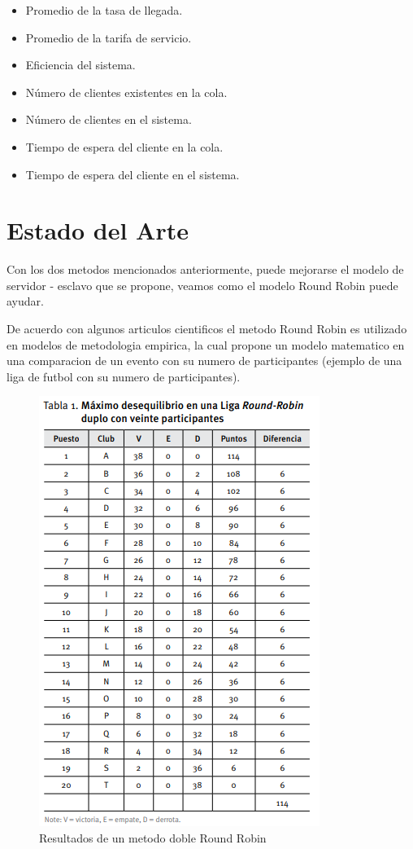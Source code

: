 \documentclass[conference,letterpaper]{IEEEtran}
\begin{document}
\begin{itemize}
    \item Promedio de la tasa de llegada.
    \item Promedio de la tarifa de servicio.
    \item Eficiencia del sistema.
    \item N\'umero de clientes existentes en la cola.
    \item N\'umero de clientes en el sistema.
    \item Tiempo de espera del cliente en la cola.
    \item Tiempo de espera del cliente en el sistema.
\end{itemize}

\section{Estado del Arte}
Con los dos metodos mencionados anteriormente, puede mejorarse el modelo de servidor - esclavo que se propone, veamos como el modelo Round Robin puede ayudar.

De acuerdo con algunos articulos cientificos el metodo Round Robin es utilizado en modelos de metodologia empirica, la cual propone un modelo matematico en una comparacion de un evento con su numero de participantes (ejemplo de una liga de futbol con su numero de participantes).

\begin{figure}[thpb]
    \centering
    \includegraphics[width=0.55\linewidth]{tabla.png}
    \caption{Resultados de un metodo doble Round Robin}
    \label{fig:tabla}
\end{figure}
\end{document}
